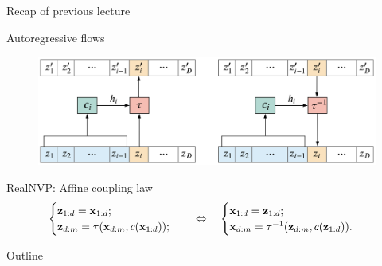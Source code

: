 \begin{frame}{Recap of previous lecture}
	\begin{block}{Autoregressive flows}
		\begin{figure}
			\includegraphics[width=0.9\linewidth]{figs/autoregressive_flow}
		\end{figure}
	\end{block}
	\begin{block}{RealNVP: Affine coupling law}
		\vspace{-0.7cm}
		\[
			\begin{cases} \mathbf{z}_{1:d} = \mathbf{x}_{1:d}; \\ \mathbf{z}_{d:m} = \tau (\mathbf{x}_{d:m}, c(\mathbf{x}_{1:d}));\end{cases} 
			\quad \Leftrightarrow \quad 
			\begin{cases} \mathbf{x}_{1:d} = \mathbf{z}_{1:d}; \\ \mathbf{x}_{d:m} = \tau^{-1} (\mathbf{z}_{d:m}, c(\mathbf{z}_{1:d})).\end{cases}
		\]
	\end{block}
\end{frame}
\begin{frame}{Outline}
	\tableofcontents
\end{frame}
